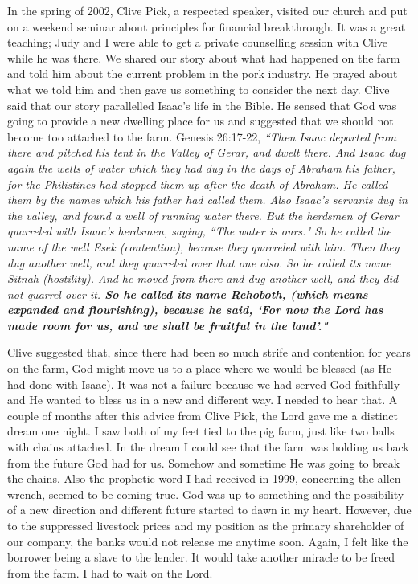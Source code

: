 \documentclass[oneside,12pt]{book}
\begin{document}
In the spring of 2002, Clive Pick, a respected speaker, visited our church and  put on a weekend seminar about principles for financial breakthrough. It was a great teaching; Judy and I were able to get a private counselling session with Clive while he was there. We shared our story about what had happened on the farm and told him about the current problem in the pork industry. He prayed about what we told him and then gave us something to consider the next day. Clive said that our story parallelled Isaac's life in the Bible. He sensed that God was going to provide a new dwelling place for us and suggested that we should not become too attached to the farm. Genesis 26:17-22, \textit{``Then Isaac departed from there and pitched his tent in the Valley of Gerar, and dwelt there. And Isaac dug again the wells of water which they had dug in the days of Abraham his father, for the Philistines had stopped them up after the death of Abraham. He called them by the names which his father had called them. Also Isaac's servants dug in the valley, and found a well of running water there. But the herdsmen of Gerar quarreled with Isaac's herdsmen, saying, ``The water is ours." So he called the name of the well Esek (contention), because they quarreled with him. Then they dug another well, and they quarreled over that one also. So he called its name Sitnah (hostility). And he moved from there and dug another well, and they did not quarrel over it. \textbf{So he called its name Rehoboth, (which means expanded and flourishing), because he said, `For now the Lord has made room for us, and we shall be fruitful in the land'."}}

Clive suggested that, since there had been so much strife and contention for years on the farm, God might move us to a place where we would be blessed (as He had done with Isaac). It was not a failure because we had served God faithfully and He wanted to bless us in a new and different way. I needed to hear that. A couple of months after this advice from Clive Pick, the Lord gave me a distinct dream one night. I saw both of my feet tied to the pig farm, just like two balls with chains attached. In the dream I could see that the farm was holding us back from the future God had for us. Somehow and sometime He was going to break the chains. Also the prophetic word I had received in 1999, concerning the allen wrench, seemed to be coming true. God was up to something and the possibility of a new direction and different future started to dawn in my heart. However, due to the suppressed livestock prices and my position as the primary shareholder of our company, the banks would not release me anytime soon. Again, I felt like the borrower being a slave to the lender. It would take another miracle to be freed from the farm. I had to wait on the Lord.
\end{document}
